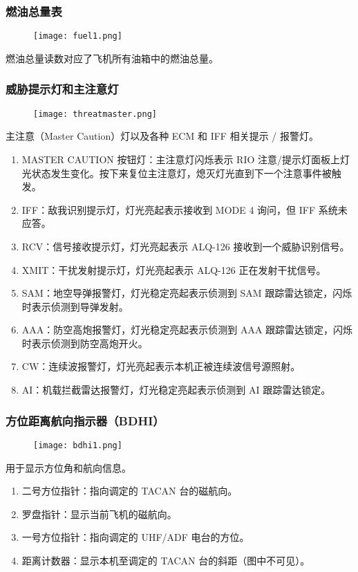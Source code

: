\subsubsection{燃油总量表}
\begin{figure}[htb]
	\centering
	\texttt{[image: fuel1.png]}
\end{figure}
燃油总量读数对应了飞机所有油箱中的燃油总量。

\subsubsection{威胁提示灯和主注意灯}
\begin{figure}[htb]
	\centering
	\texttt{[image: threatmaster.png]}
\end{figure}
主注意（Master Caution）灯以及各种 ECM 和 IFF 相关提示 / 报警灯。

\begin{enumerate}
	\item MASTER CAUTION 按钮灯：主注意灯闪烁表示 RIO 注意/提示灯面板上灯光状态发生变化。按下来复位主注意灯，熄灭灯光直到下一个注意事件被触发。
	\item IFF：敌我识别提示灯，灯光亮起表示接收到 MODE 4 询问，但 IFF 系统未应答。
	\item RCV：信号接收提示灯，灯光亮起表示 ALQ-126 接收到一个威胁识别信号。
	\item XMIT：干扰发射提示灯，灯光亮起表示 ALQ-126 正在发射干扰信号。
	\item SAM：地空导弹报警灯，灯光稳定亮起表示侦测到 SAM 跟踪雷达锁定，闪烁时表示侦测到导弹发射。
	\item AAA：防空高炮报警灯，灯光稳定亮起表示侦测到 AAA 跟踪雷达锁定，闪烁时表示侦测到防空高炮开火。
	\item CW：连续波报警灯，灯光亮起表示本机正被连续波信号源照射。
	\item AI：机载拦截雷达报警灯，灯光稳定亮起表示侦测到 AI 跟踪雷达锁定。
\end{enumerate}

\subsubsection{方位距离航向指示器（BDHI）}
\begin{figure}[htb]
	\centering
	\texttt{[image: bdhi1.png]}
\end{figure}
用于显示方位角和航向信息。

\begin{enumerate}
	\item 二号方位指针：指向调定的 TACAN 台的磁航向。
	\item 罗盘指针：显示当前飞机的磁航向。
	\item 一号方位指针：指向调定的 UHF/ADF 电台的方位。
	\item 距离计数器：显示本机至调定的 TACAN 台的斜距（图中不可见）。
\end{enumerate}

